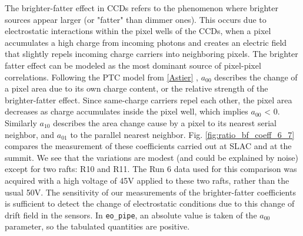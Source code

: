 The brighter-fatter effect in CCDs refers to the phenomenon where brighter sources appear larger (or "fatter" than dimmer ones). This occurs due to electrostatic interactions within the pixel wells of the CCDs, when a pixel accumulates a high charge from incoming photons and creates an electric field that slightly repels incoming charge carriers into neighboring pixels. The brighter fatter effect can be modeled as the most dominant source of pixel-pixel correlations. Following the PTC model from \hyperref[Astier]{{[}Astier{]}} 
\citet{2019A&A...629A..36A}, $a_{00}$ describes the change of a pixel area due to its own charge content, or the relative strength of the brighter-fatter effect. Since same-charge carriers repel each other, the pixel area decreases as charge accumulates inside the pixel well, which implies $a_{00}$ \textless{} 0. Similarly $a_{10}$ describes the area change cause by a pixel to its nearest serial neighbor, and $a_{01}$ to the parallel nearest neighbor. Fig. \ref{fig:ratio_bf_coeff_6_7} compares the measurement of these coefficients carried out at SLAC and at the summit. We see that the variations are modest (and could be explained by noise) except for two rafts: R10 and R11. The Run 6 data used for this comparison was acquired with a high voltage of 45V applied to these two rafts, rather than the usual 50V. The sensitivity of our measurements of the brighter-fatter coefficients is sufficient to detect the change of electrostatic conditions due to this change of drift field in the sensors. In {\tt eo\_pipe}, an absolute value is taken of the $a_{00}$ parameter, so the tabulated quantities are positive.

